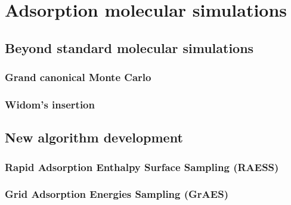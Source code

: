 \documentclass[main]{subfiles}
\begin{document}
\chapter{Adsorption molecular simulations}
\vspace*{-1\baselineskip}

\section{Beyond standard molecular simulations}

\subsection{Grand canonical Monte Carlo}


\subsection{Widom's insertion}

\section{New algorithm development}

\subsection{Rapid Adsorption Enthalpy Surface Sampling (RAESS)}

\subsection{Grid Adsorption Energies Sampling (GrAES)}

\OnlyInSubfile{\printglobalbibliography}
\end{document}
